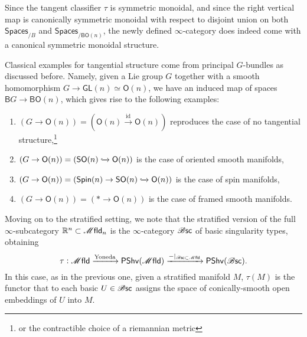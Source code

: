 \documentclass[../text]{subfiles}
\begin{document}
\begin{remark}
    Since the tangent classifier $\tau$ is symmetric monoidal, and since the right vertical map is canonically symmetric monoidal with respect to disjoint union on both $\mathsf{Spaces}_{/B}$ and $\mathsf{Spaces}_{/\mathsf{BO}(n)}$, the newly defined $\infty$-category does indeed come with a canonical symmetric monoidal structure.
\end{remark}

\begin{example}
    Classical examples for tangential structure come from principal $G$-bundles as discussed before. Namely, given a Lie group $G$ together with a smooth homomorphism $G \rightarrow \mathsf{GL}(n) \simeq \mathsf{O}(n)$, we have an induced map of spaces $\mathsf{B}G \rightarrow \mathsf{BO}(n)$, which gives rise to the following examples:
    \begin{enumerate}
        \item $(G \rightarrow \mathsf{O}(n)) = (\mathsf{O}(n) \xrightarrow{\mathrm{id}} \mathsf{O}(n))$ reproduces the case of no tangential structure,\footnote{or the contractible choice of a riemannian metric}
        \item $(G \rightarrow \mathsf{O}(n)) = (\mathsf{SO}(n) \xhookrightarrow{} \mathsf{O}(n))$ is the case of oriented smooth manifolds,
        \item $(G \rightarrow \mathsf{O}(n)) = (\mathsf{Spin}(n) \rightarrow \mathsf{SO}(n) \xhookrightarrow{} \mathsf{O}(n))$ is the case of spin manifolds,
        \item $(G \rightarrow \mathsf{O}(n)) = (* \rightarrow \mathsf{O}(n))$ is the case of framed smooth manifolds.
    \end{enumerate}
\end{example}

Moving on to the stratified setting, we note that the stratified version of the full $\infty$-subcategory $\mathbb{R}^n \subset \mfld_n$ is the $\infty$-category $\mathscr{B} \mathsf{sc}$ of basic singularity types, obtaining
%
\begin{equation}
    \tau: \mfld \xrightarrow{\mathrm{Yoneda}} \mathsf{PShv}(\mfld) \xrightarrow{-|_{\bsc \subset \mfld}} \mathsf{PShv}(\bsc).
\end{equation}
%
In this case, as in the previous one, given a stratified manifold $M$, $\tau(M)$ is the functor that to each basic $U \in \mathscr{B} \mathsf{sc}$ assigns the space of conically-smooth open embeddings of $U$ into $M$.
\end{document}
